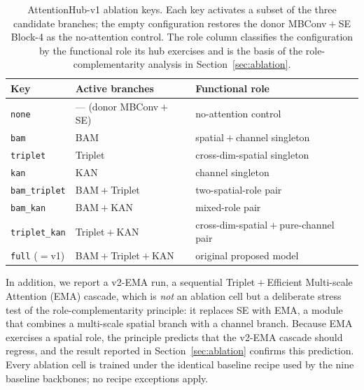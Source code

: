 \begin{table}[!t]
  \centering
  \caption{AttentionHub-v1 ablation keys. Each key activates a subset of the
  three candidate branches; the empty configuration restores the donor
  MBConv${}+{}$SE Block-4 as the no-attention control. The role column
  classifies the configuration by the functional role its hub exercises and
  is the basis of the role-complementarity analysis in
  Section~\ref{sec:ablation}.}
  \label{tab:ablkeys}
  \begin{tabularx}{\columnwidth}{@{}l l X@{}}
    \hline
    Key & Active branches & Functional role \\
    \hline
    \texttt{none} & --- (donor MBConv${}+{}$SE) & no-attention control \\
    \texttt{bam} & BAM & spatial${}+{}$channel singleton \\
    \texttt{triplet} & Triplet & cross-dim-spatial singleton \\
    \texttt{kan} & KAN & channel singleton \\
    \texttt{bam\_triplet} & BAM${}+{}$Triplet & two-spatial-role pair \\
    \texttt{bam\_kan} & BAM${}+{}$KAN & mixed-role pair \\
    \texttt{triplet\_kan} & Triplet${}+{}$KAN &
      cross-dim-spatial${}+{}$pure-channel pair \\
    \texttt{full} (${}={}$v1) & BAM${}+{}$Triplet${}+{}$KAN &
      original proposed model \\
    \hline
  \end{tabularx}
\end{table}

In addition, we report a v2-EMA run, a sequential Triplet${}+{}$Efficient
Multi-scale Attention (EMA) cascade, which is \emph{not} an ablation cell
but a deliberate stress test of the role-complementarity principle: it
replaces SE with EMA, a module that combines a multi-scale spatial branch
with a channel branch. Because EMA exercises a spatial role, the principle
predicts that the v2-EMA cascade should regress, and the result reported in
Section~\ref{sec:ablation} confirms this prediction. Every ablation cell is
trained under the identical baseline recipe used by the nine baseline
backbones; no recipe exceptions apply.
